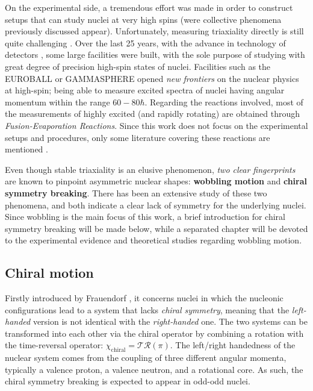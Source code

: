 On the experimental side, a tremendous effort was made in order to construct setups that can study nuclei at very high spins (were collective phenomena previously discussed appear). Unfortunately, measuring triaxiality directly is still quite challenging \cite{hamamoto2016interplay,budaca2018tilted}. Over the last 25 years, with the advance in technology of detectors \cite{henning2012stability}, some large facilities were built, with the sole purpose of studying with great degree of precision high-spin states of nuclei. Facilities such as the EUROBALL \cite{simpson1997euroball} or GAMMASPHERE \cite{lee1990gammasphere} opened \emph{new frontiers} on the nuclear physics at high-spin; being able to measure excited spectra of nuclei having angular momentum within the range $60-80\hbar$. Regarding the reactions involved, most of the measurements of highly excited (and rapidly rotating) are obtained through \emph{Fusion-Evaporation Reactions}. Since this work does not focus on the experimental setups and procedures, only some literature covering these reactions are mentioned \cite{gu2007theoretical,henning2012stability,ayangeakaa2013exotic,matta2017exotic,das2018nuclear,lewis2019lifetime,sensharma2021wobbling}.

Even though stable triaxiality is an elusive phenomenon, \emph{two clear fingerprints} are known to pinpoint asymmetric nuclear shapes: \textbf{wobbling motion} and \textbf{chiral symmetry breaking}. There has been an extensive study of these two phenomena, and both indicate a clear lack of symmetry for the underlying nuclei. Since wobbling is the main focus of this work, a brief introduction for chiral symmetry breaking will be made below, while a separated chapter will be devoted to the experimental evidence and theoretical studies regarding wobbling motion.

\subsection{Chiral motion}
\label{subsection-chiral-motion}

Firstly introduced by Frauendorf \cite{frauendorf1997tilted}, it concerns nuclei in which the nucleonic configurations lead to a system that lacks \emph{chiral symmetry}, meaning that the \emph{left-handed} version is not identical with the \emph{right-handed} one. The two systems can be transformed into each other via the chiral operator by combining a rotation with the time-reversal operator: $\chi_\text{chiral}=\mathcal{T}\mathcal{R}(\pi)$. The left/right handedness of the nuclear system comes from the coupling of three different angular momenta, typically a valence proton, a valence neutron, and a rotational core. As such, the chiral symmetry breaking is expected to appear in odd-odd nuclei.

